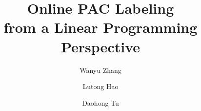 \documentclass[aspectratio=169,11pt]{beamer}
\title[Online PAC Labeling via LP]{Online PAC Labeling \\ from a Linear Programming Perspective}
\author{Wanyu Zhang \and Lutong Hao \and Daohong Tu}
\date{}
\begin{document}
\begin{frame}[plain]
  \titlepage
\end{frame}




\end{document}
